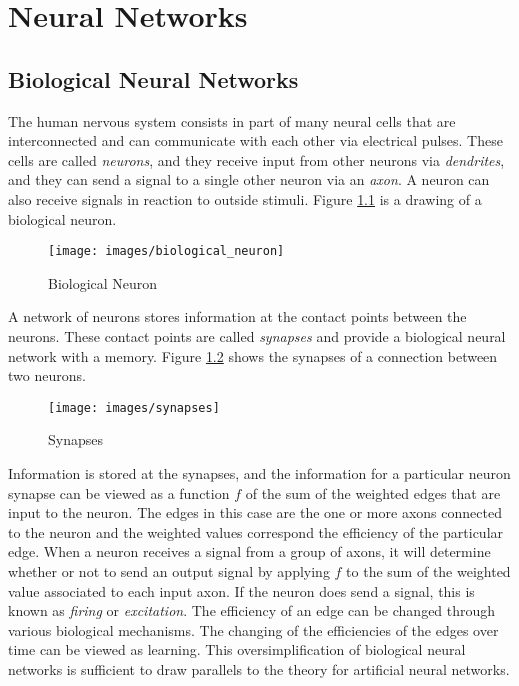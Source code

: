 \chapter[Neural Networks]{Neural Networks}

\section{Biological Neural Networks}

The human nervous system consists in part of many neural cells that are interconnected and can communicate with each other via electrical pulses.
These cells are called {\it neurons}, and they receive input from other neurons via {\it dendrites}, and they can send a signal to a single other neuron via an {\it axon}.
A neuron can also receive signals in reaction to outside stimuli.
Figure \ref{biological_neuron} is a drawing of a biological neuron. 

\begin{figure}[h!]
  \centering
  \texttt{[image: images/biological\_neuron]}
  \caption{Biological Neuron}
  \label{biological_neuron}
\end{figure}

A network of neurons stores information at the contact points between the neurons.
These contact points are called {\it synapses} and provide a biological neural network with a memory.
Figure \ref{synapses} shows the synapses of a connection between two neurons.

\begin{figure}[h!]
  \centering
  \texttt{[image: images/synapses]}
  \caption{Synapses}
  \label{synapses}
\end{figure}

Information is stored at the synapses, and the information for a particular neuron synapse can be viewed as a function $f$ of the sum of the weighted edges that are input to the neuron.
The edges in this case are the one or more axons connected to the neuron and the weighted values correspond the efficiency of the particular edge. 
When a neuron receives a signal from a group of axons, it will determine whether or not to send an output signal by applying $f$ to the sum of the weighted value associated to each input axon.
If the neuron does send a signal, this is known as {\it firing} or {\it excitation}.
The efficiency of an edge can be changed through various biological mechanisms.
The changing of the efficiencies of the edges over time can be viewed as learning.
This oversimplification of biological neural networks is sufficient to draw parallels to the theory for artificial neural networks.

